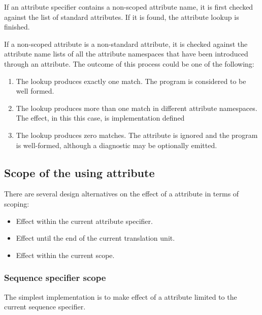 If an attribute specifier contains a non-scoped attribute name, it is
first checked against the list of standard attributes. If it is found,
the attribute lookup is finished.

If a non-scoped attribute is a non-standard attribute, it is checked
against the attribute name lists of all the attribute namespaces that have been
introduced through an  attribute. The outcome of this process
could be one of the following:

\begin{enumerate}

\item The lookup produces exactly one match. The program is considered
to be well formed.

\item The lookup produces more than one match in different attribute namespaces.
The effect, in this this case, is implementation defined

\item The lookup produces zero matches. The attribute is ignored and the
program is well-formed, although a diagnostic may be optionally emitted.

\end{enumerate}

\subsection{Scope of the using attribute}
\label{scoping}

There are several design alternatives on the effect of a 
attribute in terms of scoping:

\begin{itemize}

\item Effect within the current attribute specifier.
\item Effect until the end of the current translation unit.
\item Effect within the current scope.

\end{itemize}

\subsubsection{Sequence specifier scope}

The simplest implementation is to make effect of a  attribute
limited to the current sequence specifier.

